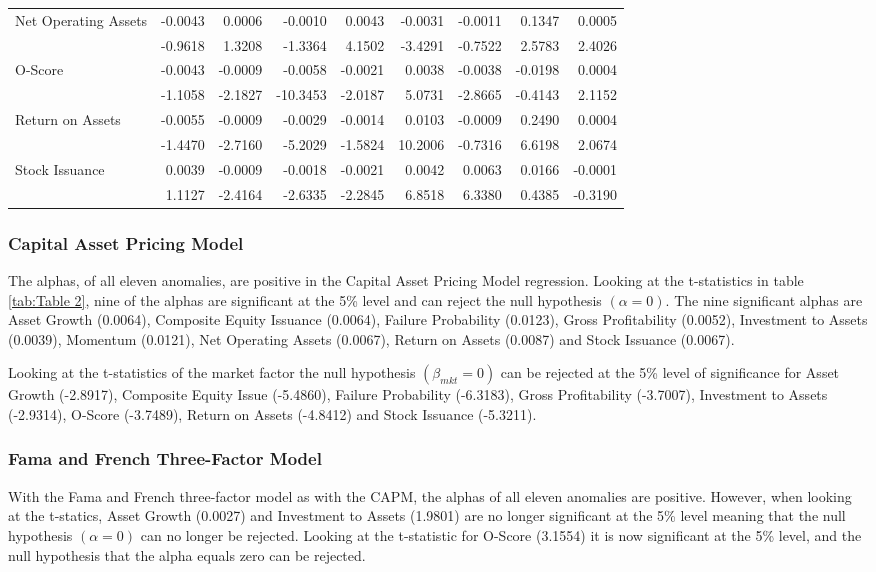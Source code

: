 \documentclass[a4paper]{article}                 %
\begin{document}
\begin{table}[h]
{\begin{tabular}{@{}lrrrrrrrr@{}}
    \multirow{2}{*}{Net Operating Assets} & -0.0043 & 0.0006 & -0.0010 & 0.0043 & -0.0031 & -0.0011 & 0.1347 & 0.0005 \\
     & -0.9618 & 1.3208 & -1.3364 & 4.1502 & -3.4291 & -0.7522 & 2.5783 & 2.4026 \\
    \multirow{2}{*}{O-Score} & -0.0043 & -0.0009 & -0.0058 & -0.0021 & 0.0038 & -0.0038 & -0.0198 & 0.0004 \\
     & -1.1058 & -2.1827 & -10.3453 & -2.0187 & 5.0731 & -2.8665 & -0.4143 & 2.1152 \\
    \multirow{2}{*}{Return on Assets} & -0.0055 & -0.0009 & -0.0029 & -0.0014 & 0.0103 & -0.0009 & 0.2490 & 0.0004 \\
     & -1.4470 & -2.7160 & -5.2029 & -1.5824 & 10.2006 & -0.7316 & 6.6198 & 2.0674 \\
    \multirow{2}{*}{Stock Issuance} & 0.0039 & -0.0009 & -0.0018 & -0.0021 & 0.0042 & 0.0063 & 0.0166 & -0.0001 \\
     & 1.1127 & -2.4164 & -2.6335 & -2.2845 & 6.8518 & 6.3380 & 0.4385 & -0.3190 \\ \bottomrule
    \end{tabular}%
    }
    \end{table}

\subsubsection{Capital Asset Pricing Model}
The alphas, of all eleven anomalies, are positive in the Capital Asset Pricing Model regression. Looking at the t-statistics in table \ref{tab:Table 2}, nine of the alphas are significant at the 5\% level and can reject the null hypothesis $(\alpha=0)$. The nine significant alphas are Asset Growth (0.0064), Composite Equity Issuance (0.0064), Failure Probability (0.0123), Gross Profitability (0.0052), Investment to Assets (0.0039), Momentum (0.0121), Net Operating Assets (0.0067), Return on Assets (0.0087) and Stock Issuance (0.0067).

Looking at the t-statistics of the market factor the null hypothesis $(\beta_{mkt}= 0)$ can be rejected at the 5\% level of significance for Asset Growth (-2.8917), Composite Equity Issue (-5.4860), Failure Probability (-6.3183), Gross Profitability (-3.7007), Investment to Assets (-2.9314), O-Score (-3.7489), Return on Assets (-4.8412) and Stock Issuance (-5.3211). 

\subsubsection{Fama and French Three-Factor Model}
With the Fama and French three-factor model as with the CAPM, the alphas of all eleven anomalies are positive. However, when looking at the t-statics, Asset Growth (0.0027) and Investment to Assets (1.9801) are no longer significant at the 5\% level meaning that the null hypothesis $(\alpha=0)$ can no longer be rejected. Looking at the t-statistic for O-Score (3.1554) it is now significant at the 5\% level, and the null hypothesis that the alpha equals zero can be rejected. 
\end{document}
